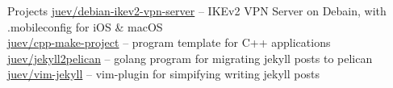 \documentclass{resume} %
\begin{document}
\begin{rSection}{Projects}
\href{https://github.com/juev/debian-ikev2-vpn-server}{juev/debian-ikev2-vpn-server} -- IKEv2 VPN Server on Debain, with .mobileconfig for iOS \& macOS \\ %
\href{https://github.com/juev/cpp-make-project}{juev/cpp-make-project} -- program template for C++ applications \\ %
\href{https://github.com/juev/jekyll2pelican}{juev/jekyll2pelican} -- golang program for migrating jekyll posts to pelican \\ %
\href{https://github.com/juev/vim-jekyll}{juev/vim-jekyll} -- vim-plugin for simpifying writing jekyll posts \\ %

\end{rSection}
\end{document}
